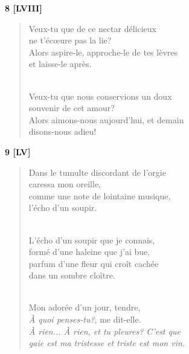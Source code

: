 \documentclass[a4paper,12pt]{book}
\begin{document}
\bigskip

\begin{center} {\bf 8 [LVIII]} \end{center}

\begin{verse}
Veux-tu que de ce nectar délicieux \\
ne t'éc{\oe}ure pas la lie? \\
Alors aspire-le, approche-le de tes lèvres \\
et laisse-le après. \\ \

Veux-tu que nous conservions un doux \\
souvenir de cet amour? \\
Alors aimons-nous aujourd'hui, et demain \\
disons-nous adieu! \\
\end{verse}

\bigskip

\begin{center} {\bf 9 [LV]} \end{center}

\begin{verse}
Dans le tumulte discordant de l'orgie \\
caressa mon oreille, \\
comme une note de lointaine musique, \\
l'écho d'un soupir. \\ \

L'écho d'un soupir que je connais, \\
formé d'une haleine que j'ai bue, \\
parfum d'une fleur qui croît cachée \\
dans un sombre cloître. \\ \

Mon adorée d'un jour, tendre, \\
{\em À quoi penses-tu?\/}, me dit-elle. \\
{\em À rien... À rien, et tu pleures? C'est que \\
gaie est ma tristesse et triste est mon vin.} \\
\end{verse}

\end{document}
